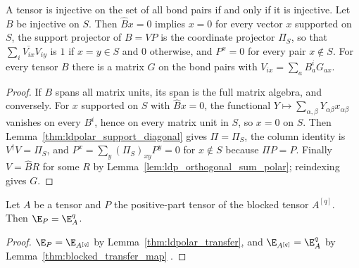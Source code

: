 \begin{lemma}
    \label{thm:ldpolar_tensor_injective_on}
    \leanok
    A tensor is injective on the set of all bond pairs if and only if it is
    injective. Let $B$ be injective on $S$. Then $\widehat Bx=0$ implies $x=0$
    for every vector $x$ supported on $S$, the support projector of $B=VP$ is
    the coordinate projector $\Pi_S$, so that
    $\sum_i\overline{V_{ix}}V_{iy}$ is $1$ if $x=y\in S$ and $0$ otherwise,
    and $P^x=0$ for every pair $x\notin S$. For every tensor $B$ there is a
    matrix $G$ on the bond pairs with $V_{ix}=\sum_aB^i_aG_{ax}$.
\end{lemma}
\begin{proof}
    \leanok
    If $B$ spans all matrix units, its span is the full matrix algebra, and
    conversely. For $x$ supported on $S$ with $\widehat Bx=0$, the functional
    $Y\mapsto\sum_{\alpha,\beta}Y_{\alpha\beta}x_{\alpha\beta}$ vanishes on
    every $B^i$, hence on every matrix unit in $S$, so $x=0$ on $S$. Then
    Lemma~\ref{thm:ldpolar_support_diagonal} gives $\Pi=\Pi_S$, the column
    identity is $V^\dagger V=\Pi_S$, and $P^x=\sum_y(\Pi_S)_{xy}P^y=0$ for
    $x\notin S$ because $\Pi P=P$. Finally $V=\widehat BR$ for some $R$ by
    Lemma~\ref{lem:ldp_orthogonal_sum_polar}; reindexing gives $G$.
\end{proof}

\begin{lemma}
    \label{thm:ldpolar_blocked_transfer}
    \leanok
    Let $A$ be a tensor and $P$ the positive-part tensor of the blocked
    tensor $A^{[q]}$. Then $\E_P=\E_A^q$.
\end{lemma}
\begin{proof}
    \leanok
    $\E_P=\E_{A^{[q]}}$ by Lemma~\ref{thm:ldpolar_transfer}, and
    $\E_{A^{[q]}}=\E_A^q$ by
    Lemma~\ref{thm:blocked_transfer_map}
    \cite[eq.~(6)]{Malz2024Preparation}.
\end{proof}

